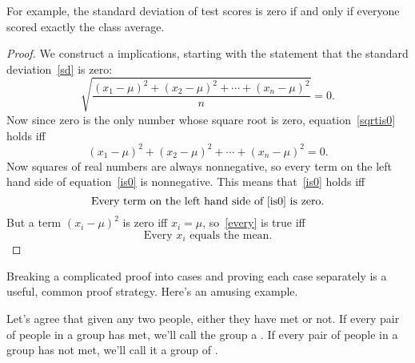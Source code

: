 For example, the standard deviation of test scores is zero if and only
if everyone scored exactly the class average.

\begin{proof}
We construct a  implications, starting with the
statement that the standard deviation~\eqref{sd} is zero:
%
\begin{equation}\label{sqrtis0}
\sqrt{\frac{(x_1 - \mu)^2 + (x_2 - \mu)^2 + \cdots + (x_n - \mu)^2}{n}} = 0.
\end{equation}
%
Now since zero is the only number whose square root is zero,
equation~\eqref{sqrtis0} holds iff
\begin{equation}\label{is0}
(x_1 - \mu)^2 + (x_2 - \mu)^2 + \cdots + (x_n - \mu)^2 = 0.
\end{equation}
Now squares of real numbers are always nonnegative, so every term on the
left hand side of equation~\eqref{is0} is nonnegative.  This means
that~\eqref{is0} holds iff
\begin{equation}\label{every}
\text{Every term on the left hand side of~\eqref{is0} is zero.}
\end{equation}
But a term $(x_i - \mu)^2$ is zero iff $x_i=\mu$, so~\eqref{every} is true
iff
\[
\text{Every $x_i$ equals the mean.}
\]

\end{proof}

\iffalse

\begin{notesproblem}
Reformulate the proof of the Distributive Law for Sets as a chain of
if-and-only-if implications.
\end{notesproblem}
\fi



Breaking a complicated proof into cases and proving each case separately
is a useful, common proof strategy.  Here's an amusing example.

Let's agree that given any two people, either they have met or not.  If
every pair of people in a group has met, we'll call the group a
.  If every pair of people in a group has not met, we'll call
it a group of .

